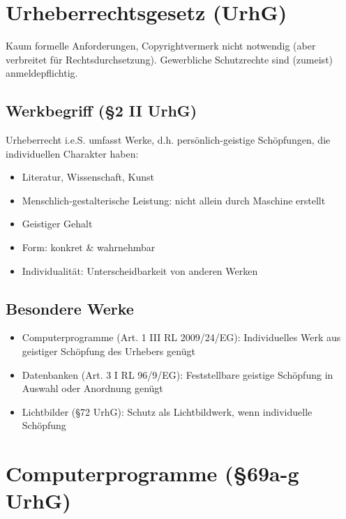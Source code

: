 \documentclass{article}
\begin{document}


\section{Urheberrechtsgesetz (UrhG)}


Kaum formelle Anforderungen, Copyrightvermerk nicht notwendig (aber verbreitet für Rechtsdurchsetzung). Gewerbliche Schutzrechte sind (zumeist) anmeldepflichtig.

\subsection{Werkbegriff (§2 II UrhG)}
Urheberrecht i.e.S. umfasst Werke, d.h. persönlich-geistige Schöpfungen, die individuellen Charakter haben:
\begin{itemize}
  \item Literatur, Wissenschaft, Kunst
  \item Menschlich-gestalterische Leistung: nicht allein durch Maschine erstellt
  \item Geistiger Gehalt
  \item Form: konkret \& wahrnehmbar
  \item Individualität: Unterscheidbarkeit von anderen Werken
\end{itemize}

\subsection{Besondere Werke}
\begin{itemize}
  \item Computerprogramme (Art. 1 III RL 2009/24/EG): Individuelles Werk aus geistiger Schöpfung des Urhebers genügt
  \item Datenbanken (Art. 3 I RL 96/9/EG): Feststellbare geistige Schöpfung in Auswahl oder Anordnung genügt
  \item Lichtbilder (§72 UrhG): Schutz als Lichtbildwerk, wenn individuelle Schöpfung
\end{itemize}

\section{Computerprogramme (§69a-g UrhG)}
\end{document}

